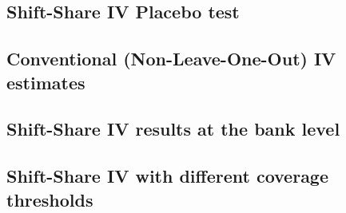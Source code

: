 \documentclass[12pt]{article}
\begin{document}
%     

\subsection{Shift-Share IV Placebo test} \label{placebo}

\begin{table}[H]
    \caption{Placebo tests: Shift-Share IV on pre-period (five-year) outcome changes}
    \label{placebo_table}
    \centering
    \small
    
\end{table}

\subsection{Conventional (Non-Leave-One-Out) IV estimates} \label{naive}

\begin{table}[H]
    \caption{Shift-Share IV estimates using the conventional (Non-Leave-One-Out) instrument}
    \label{naive_table}
    \centering
    \small
    
\end{table}

\subsection{Shift-Share IV results at the bank level} \label{bank}

\begin{table}[H]
    \caption{Bank level IV estimates: Khwaja-Mian-style identification at the bank-year}
    \label{bank_table}
    \centering
    \small
    
\end{table}

\subsection{Shift-Share IV with different coverage thresholds} \label{sensitivity}

\begin{table}[H]
    \caption{Sensitivity to instrument coverage threshold}
    \label{sensitivity_table}
    \centering
    \small
    
\end{table}
\end{document}
